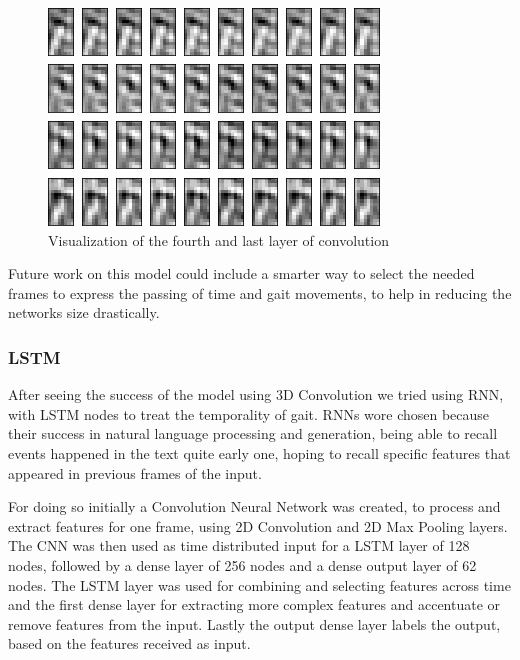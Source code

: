 \documentclass[12pt]{article}
\theoremstyle{definition}
\begin{document}
	\begin{figure}
		\includegraphics[width=\textwidth]{conv-see/visualization-16.jpg}
		\caption{Visualization of the fourth and last layer of convolution}
		\label{figure:visualize-conv-4}
	\end{figure}

	Future work on this model could include a smarter way to select the needed frames to express the passing of time and gait movements, to help in reducing the networks size drastically.

	\subsubsection{LSTM}

	After seeing the success of the model using 3D Convolution we tried using RNN, with LSTM nodes to treat the temporality of gait. RNNs wore chosen because their success in natural language processing and generation, being able to recall events happened in the text quite early one, hoping to recall specific features that appeared in previous frames of the input.

	For doing so initially a Convolution Neural Network was created, to process and extract features for one frame, using 2D Convolution and 2D Max Pooling layers. The CNN was then used as time distributed input for a LSTM layer of 128 nodes, followed by a dense layer of 256 nodes and a dense output layer of 62 nodes.
	The LSTM layer was used for combining and selecting features across time and the first dense layer for extracting more complex features and accentuate or remove features from the input. Lastly the output dense layer labels the output, based on the features received as input.
\end{document}
